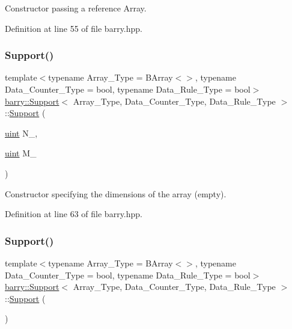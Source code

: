Constructor passing a reference Array. 



Definition at line 55 of file barry.\+hpp.

\mbox{\label{classbarry_1_1_support_a0deea9b8e83fd418dfad59fb4cfb2ad5}} 
\subsubsection{\texorpdfstring{Support()}{Support()}\hspace{0.1cm}{\footnotesize\ttfamily [2/3]}}
{\footnotesize\ttfamily template$<$typename Array\+\_\+\+Type  = B\+Array$<$$>$, typename Data\+\_\+\+Counter\+\_\+\+Type  = bool, typename Data\+\_\+\+Rule\+\_\+\+Type  = bool$>$ \\
\hyperlink{classbarry_1_1_support}{barry\+::\+Support}$<$ Array\+\_\+\+Type, Data\+\_\+\+Counter\+\_\+\+Type, Data\+\_\+\+Rule\+\_\+\+Type $>$\+::\hyperlink{classbarry_1_1_support}{Support} (\begin{DoxyParamCaption}\item[{\hyperlink{namespacebarry_a11dfc53ddb4672278319aa04f1e09a6c}{uint}}]{N\+\_\+,  }\item[{\hyperlink{namespacebarry_a11dfc53ddb4672278319aa04f1e09a6c}{uint}}]{M\+\_\+ }\end{DoxyParamCaption})\hspace{0.3cm}{\ttfamily [inline]}}



Constructor specifying the dimensions of the array (empty). 



Definition at line 63 of file barry.\+hpp.

\mbox{\label{classbarry_1_1_support_a08a48546e91c5259a26be4cde31ef902}} 
\subsubsection{\texorpdfstring{Support()}{Support()}\hspace{0.1cm}{\footnotesize\ttfamily [3/3]}}
{\footnotesize\ttfamily template$<$typename Array\+\_\+\+Type  = B\+Array$<$$>$, typename Data\+\_\+\+Counter\+\_\+\+Type  = bool, typename Data\+\_\+\+Rule\+\_\+\+Type  = bool$>$ \\
\hyperlink{classbarry_1_1_support}{barry\+::\+Support}$<$ Array\+\_\+\+Type, Data\+\_\+\+Counter\+\_\+\+Type, Data\+\_\+\+Rule\+\_\+\+Type $>$\+::\hyperlink{classbarry_1_1_support}{Support} (\begin{DoxyParamCaption}{ }\end{DoxyParamCaption})\hspace{0.3cm}{\ttfamily [inline]}}



